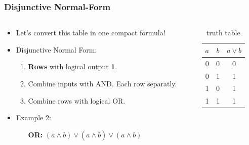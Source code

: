 \documentclass{beamer}
\begin{document}
\begin{frame}\frametitle{Disjunctive Normal-Form}
  
  \begin{columns}
  \begin{column}{6cm}
  \begin{itemize}
    \item Let's convert this table in one compact formula!
    \item Disjunctive Normal Form:
    \begin{enumerate}
     \item \textbf{Rows} with logical output \textbf{1}.
     \item Combine inputs with AND. Each row separatly.
     \item Combine rows with logical OR.
    \end{enumerate}
    \item Example 2: 
    \begin{itemize}
      \item [\textbf{OR:}]$(\overline{a}\land b)\lor(a\land \overline{b})\lor(a\land b)$
    \end{itemize}
  \end{itemize}
  \end{column}
  
    
  \begin{column}{6cm}
  \begin{table}[H]
  \centering
  \begin{tabular}{c|c||c}
  \textbf{$a$} & \textbf{$b$} & \textbf{$a\lor b$} \\ \hline
  0          & 0          & 0      \\
  0          & 1          & 1  \\
  1          & 0          & 1   \\
  1          & 1          & 1 
  \end{tabular}
  \caption{truth table}
  \label{tab:truth}
  \end{table}
  \end{column}
  
  \end{columns}  
  
  
  
\end{frame}
\end{document}
